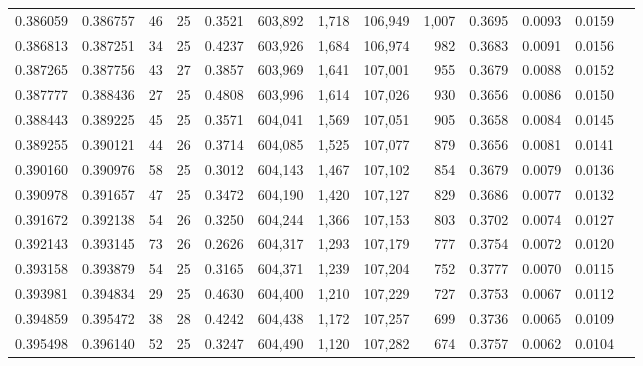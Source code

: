 \begin{tabular}{rrrrrrrrrrrrr}
0.386059 & 0.386757 &  46 &  25 &                                     0.3521 & 603,892 &   1,718 & 106,949 &   1,007 & 0.3695 & 0.0093 & 0.0159 \\
0.386813 & 0.387251 &  34 &  25 &                                     0.4237 & 603,926 &   1,684 & 106,974 &     982 & 0.3683 & 0.0091 & 0.0156 \\
0.387265 & 0.387756 &  43 &  27 &                                     0.3857 & 603,969 &   1,641 & 107,001 &     955 & 0.3679 & 0.0088 & 0.0152 \\
0.387777 & 0.388436 &  27 &  25 &                                     0.4808 & 603,996 &   1,614 & 107,026 &     930 & 0.3656 & 0.0086 & 0.0150 \\
0.388443 & 0.389225 &  45 &  25 &                                     0.3571 & 604,041 &   1,569 & 107,051 &     905 & 0.3658 & 0.0084 & 0.0145 \\
0.389255 & 0.390121 &  44 &  26 &                                     0.3714 & 604,085 &   1,525 & 107,077 &     879 & 0.3656 & 0.0081 & 0.0141 \\
0.390160 & 0.390976 &  58 &  25 &                                     0.3012 & 604,143 &   1,467 & 107,102 &     854 & 0.3679 & 0.0079 & 0.0136 \\
0.390978 & 0.391657 &  47 &  25 &                                     0.3472 & 604,190 &   1,420 & 107,127 &     829 & 0.3686 & 0.0077 & 0.0132 \\
0.391672 & 0.392138 &  54 &  26 &                                     0.3250 & 604,244 &   1,366 & 107,153 &     803 & 0.3702 & 0.0074 & 0.0127 \\
0.392143 & 0.393145 &  73 &  26 &                                     0.2626 & 604,317 &   1,293 & 107,179 &     777 & 0.3754 & 0.0072 & 0.0120 \\
0.393158 & 0.393879 &  54 &  25 &                                     0.3165 & 604,371 &   1,239 & 107,204 &     752 & 0.3777 & 0.0070 & 0.0115 \\
0.393981 & 0.394834 &  29 &  25 &                                     0.4630 & 604,400 &   1,210 & 107,229 &     727 & 0.3753 & 0.0067 & 0.0112 \\
0.394859 & 0.395472 &  38 &  28 &                                     0.4242 & 604,438 &   1,172 & 107,257 &     699 & 0.3736 & 0.0065 & 0.0109 \\
0.395498 & 0.396140 &  52 &  25 &                                     0.3247 & 604,490 &   1,120 & 107,282 &     674 & 0.3757 & 0.0062 & 0.0104 \\

\end{tabular}

